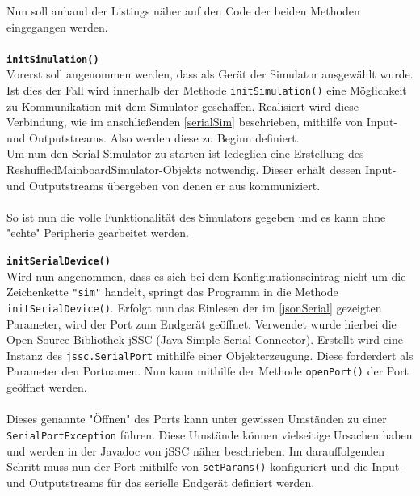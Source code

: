 Nun soll anhand der Listings näher auf den Code der beiden Methoden eingegangen werden.
\\\\
\textbf{\lstinline{initSimulation()}}
\\
Vorerst soll angenommen werden, dass als Gerät der Simulator ausgewählt wurde.
Ist dies der Fall wird innerhalb der Methode \lstinline{initSimulation()} eine Möglichkeit zu Kommunikation mit dem Simulator geschaffen.
Realisiert wird diese Verbindung, wie im anschließenden \autoref{serialSim} beschrieben, mithilfe von Input- und Outputstreams.
Also werden diese zu Beginn definiert.\\
Um nun den Serial-Simulator zu starten ist ledeglich eine Erstellung des ReshuffledMainboardSimulator-Objekts notwendig.
Dieser erhält dessen Input- und Outputstreams übergeben von denen er aus kommuniziert.\\\\
So ist nun die volle Funktionalität des Simulators gegeben und es kann ohne "echte" Peripherie gearbeitet werden.

\textbf{\lstinline{initSerialDevice()}}
\\
Wird nun angenommen, dass es sich bei dem Konfigurationseintrag nicht um die Zeichenkette \lstinline[style=json]{"sim"} handelt, springt das Programm in die Methode \lstinline{initSerialDevice()}.
Erfolgt nun das Einlesen der im \autoref{jsonSerial} gezeigten Parameter, wird der Port zum Endgerät geöffnet.
Verwendet wurde hierbei die Open-Source-Bibliothek jSSC (Java Simple Serial Connector).
Erstellt wird eine Instanz des \lstinline[style=java]{jssc.SerialPort} mithilfe einer Objekterzeugung.
Diese forderdert als Parameter den Portnamen.
Nun kann mithilfe der Methode \lstinline{openPort()} der Port geöffnet werden.\\\\
Dieses genannte "Öffnen" des Ports kann unter gewissen Umständen zu einer \lstinline[style=java]{SerialPortException} führen.
Diese Umstände können vielseitige Ursachen haben und werden in der Javadoc von jSSC näher beschrieben.
Im darauffolgenden Schritt muss nun der Port mithilfe von \lstinline[style=java]{setParams()} konfiguriert und die Input- und Outputstreams für das serielle Endgerät definiert werden.\\\\

